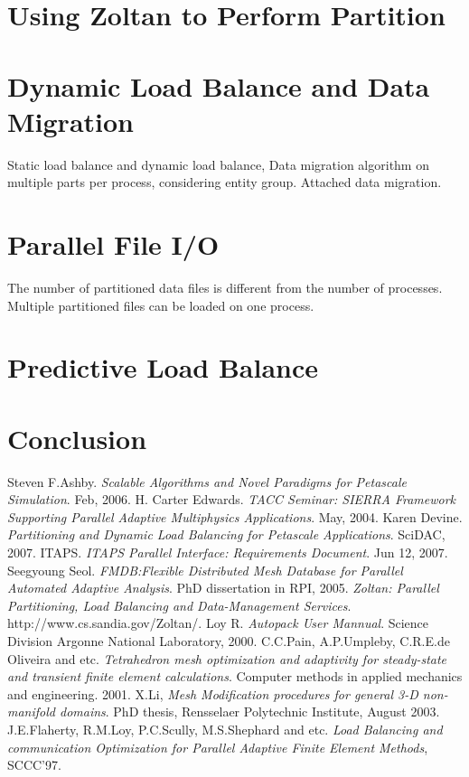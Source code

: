 \documentclass[10pt]{article}
\begin{document}
\section{Using Zoltan to Perform Partition}    

   


\section{Dynamic Load Balance and Data Migration}  %

Static load balance and dynamic load balance, 
Data migration algorithm on multiple parts per process, considering
entity group. 
Attached data migration. 

\section{Parallel File I/O}       %

The number of partitioned data files is different from the number of
processes. Multiple partitioned files can be loaded on one process. 

\section{Predictive Load Balance}  



\section{Conclusion}


\begin{thebibliography}{9}
 Steven F.Ashby. \textit{Scalable Algorithms and Novel
  Paradigms for Petascale Simulation}. Feb, 2006.
 H. Carter Edwards. \textit{TACC Seminar:
SIERRA Framework Supporting Parallel Adaptive Multiphysics
Applications}. May, 2004. 
 Karen Devine. \textit{Partitioning and Dynamic Load
  Balancing for Petascale Applications}. SciDAC, 2007.
 ITAPS. \textit{ITAPS Parallel Interface: Requirements
  Document}. Jun 12, 2007. 
 Seegyoung Seol. \textit{FMDB:Flexible Distributed Mesh
  Database for Parallel Automated Adaptive Analysis}. PhD dissertation
  in RPI, 2005.
 \textit{Zoltan: Parallel Partitioning, Load Balancing and Data-Management
Services}. http://www.cs.sandia.gov/Zoltan/.
 Loy R. \textit{Autopack User Mannual}. Science Division
  Argonne National Laboratory, 2000. 
 C.C.Pain, A.P.Umpleby, C.R.E.de Oliveira and
  etc. \textit{Tetrahedron mesh optimization and adaptivity for steady-state and transient finite
element calculations}. Computer methods in applied mechanics and
engineering. 2001.
 X.Li, \textit{Mesh Modification procedures for general 3-D non-manifold domains}. PhD thesis, Rensselaer Polytechnic Institute, August 2003.
 J.E.Flaherty, R.M.Loy, P.C.Scully, M.S.Shephard and
  etc. \textit{Load Balancing and communication Optimization for
  Parallel Adaptive Finite Element Methods}, SCCC'97.

\end{thebibliography}
\end{document}
